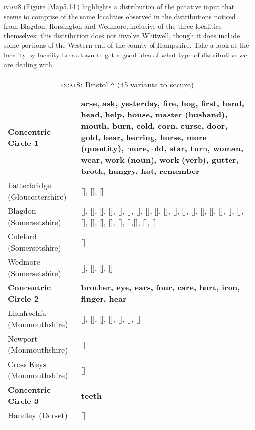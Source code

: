 \textsc{ivdm8} (Figure \ref{Map5.14}) highlights a distribution of the putative input that seems to comprise of the same localities observed in the distributions noticed from Blagdon, Horsington and Wedmore, inclusive of the three localities themselves; this distribution does not involve Whitwell, though it does include some portions of the Western end of the county of Hampshire. Take a look at the locality-by-locality breakdown to get a good idea of what type of distribution we are dealing with.

\begin{table}
\begin{tabularx}{\textwidth}{lQ}
\lsptoprule 
\textbf{Concentric Circle 1} & \textbf{arse, ask, yesterday, fire, hog, first, hand, head, help, house, master (husband), mouth, burn, cold, corn, curse, door, gold, hear, herring, horse, more (quantity), more, old, star, turn, woman, wear, work (noun), work (verb), gutter, broth, hungry, hot, remember} \\  
Latterbridge (Gloucestershire) &  [], [], []\\
Blagdon (Somersetshire) &  [], [], [], [], [], [], [], [], [], [], [], [], [], [], [], [], [],  [], [], [], [], [], [], [],[], [], []\\
Coleford (Somersetshire) &  []\\

Wedmore (Somersetshire) & [], [], [], []  \\

\textbf{Concentric Circle 2} & \textbf{brother, eye, ears, four, care, hurt, iron, finger, hear}\\
Llanfrechfa (Monmouthshire) & [], [], [], [], [], [], []   \\
Newport (Monmouthshire) &  [] \\
Cross Keys (Monmouthshire) &  []\\

\textbf{Concentric Circle 3} & \textbf{teeth}\\ 
Handley (Dorset) & [] \\
\lspbottomrule 
\end{tabularx}
\caption{\textsc{ccat8}: Bristol \textsuperscript{x} (45 variants to secure)}
\label{Table 5.9}
\end{table}

